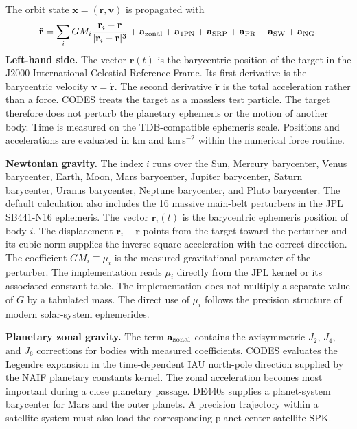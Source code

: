 The orbit state $\mathbf{x}=(\mathbf{r},\mathbf{v})$ is propagated with
\begin{equation}
 \ddot{\mathbf r}
 = \sum_i GM_i
 \frac{\mathbf r_i-\mathbf r}{|\mathbf r_i-\mathbf r|^3}
 +\mathbf a_{\rm zonal}
 +\mathbf a_{\rm 1PN}
 +\mathbf a_{\rm SRP}
 +\mathbf a_{\rm PR}
 +\mathbf a_{\rm SW}
 +\mathbf a_{\rm NG}.
 \label{eq:force-model}
\end{equation}
\textbf{Left-hand side.}
The vector $\mathbf r(t)$ is the barycentric position of the target in the
J2000 International Celestial Reference Frame. Its first derivative is the
barycentric velocity $\mathbf v=\dot{\mathbf r}$. The second derivative
$\ddot{\mathbf r}$ is the total acceleration rather than a force. CODES treats
the target as a massless test particle. The target therefore does not perturb
the planetary ephemeris or the motion of another body. Time is measured on
the TDB-compatible ephemeris scale. Positions and accelerations are evaluated
in km and km\,s$^{-2}$ within the numerical force routine.

\textbf{Newtonian gravity.}
The index $i$ runs over the Sun, Mercury barycenter, Venus barycenter, Earth,
Moon, Mars barycenter, Jupiter barycenter, Saturn barycenter, Uranus
barycenter, Neptune barycenter, and Pluto barycenter. The default calculation
also includes the 16 massive main-belt perturbers in the JPL SB441-N16
ephemeris. The vector $\mathbf r_i(t)$ is the barycentric ephemeris position
of body $i$. The displacement $\mathbf r_i-\mathbf r$ points from the target
toward the perturber and its cubic norm supplies the inverse-square
acceleration with the correct direction. The coefficient $GM_i\equiv\mu_i$
is the measured gravitational parameter of the perturber. The implementation
reads $\mu_i$ directly from the JPL kernel or its associated constant table.
The implementation does not multiply a separate value of $G$ by a tabulated mass. The direct
use of $\mu_i$ follows the precision structure of modern solar-system
ephemerides.

\textbf{Planetary zonal gravity.}
The term $\mathbf a_{\rm zonal}$ contains the axisymmetric $J_2$, $J_4$, and
$J_6$ corrections for bodies with measured coefficients. CODES evaluates the
Legendre expansion in the time-dependent IAU north-pole direction supplied
by the NAIF planetary constants kernel. The zonal acceleration becomes most
important during a close planetary passage. DE440s supplies a planet-system barycenter
for Mars and the outer planets. A precision trajectory within a satellite
system must also load the corresponding planet-center satellite SPK.


